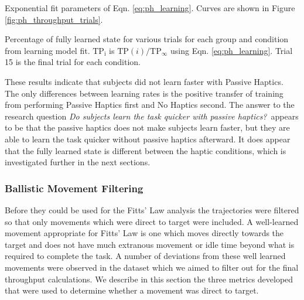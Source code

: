 \begin{table}
    \centering
    \caption{Exponential fit parameters of Eqn. \ref{eq:ph_learning}. Curves are shown in Figure \ref{fig:ph_throughput_trials}.}
    \label{tab:ph_tp_regression}
\end{table}

\begin{table}
    \centering
    \caption{Percentage of fully learned state for various trials for each group and condition from learning model fit. $\mathrm{TP_i}$ is $\mathrm{TP}(i)/\mathrm{TP}_{\infty}$ using Eqn. \ref{eq:ph_learning}. Trial 15 is the final trial for each condition.}
    \label{tab:ph_tp_regression_values}
\end{table}

These results indicate that subjects did not learn faster with Passive Haptics.
The only differences between learning rates is the positive transfer of training from performing Passive Haptics first and No Haptics second.
The answer to the research question \textit{Do subjects learn the task quicker with passive haptics?}\ appears to be that the passive haptics does not make subjects learn faster, but they are able to learn the task quicker without passive haptics afterward.
It does appear that the fully learned state is different between the haptic conditions, which is investigated further in the next sections.

\subsubsection{Ballistic Movement Filtering}
\label{sec:ph_ballistic_filter}

Before they could be used for the Fitts' Law analysis the trajectories were filtered so that only movements which were direct to target were included.
A well-learned movement appropriate for Fitts' Law is one which moves directly towards the target and does not have much extranous movement or idle time beyond what is required to complete the task.
A number of deviations from these well learned movements were observed in the dataset which we aimed to filter out for the final throughput calculations.
We describe in this section the three metrics developed that were used to determine whether a movement was direct to target.


